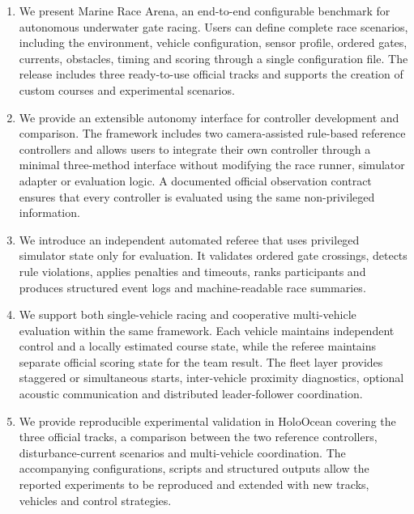 \begin{enumerate}

\item We present Marine Race Arena, an end-to-end configurable benchmark for autonomous underwater gate racing. Users can define complete race scenarios, including the environment, vehicle configuration, sensor profile, ordered gates, currents, obstacles, timing and scoring through a single configuration file. The release includes three ready-to-use official tracks and supports the creation of custom courses and experimental scenarios.

\item We provide an extensible autonomy interface for controller development and comparison. The framework includes two camera-assisted rule-based reference controllers and allows users to integrate their own controller through a minimal three-method interface without modifying the race runner, simulator adapter or evaluation logic. A documented official observation contract ensures that every controller is evaluated using the same non-privileged information.

\item We introduce an independent automated referee that uses privileged simulator state only for evaluation. It validates ordered gate crossings, detects rule violations, applies penalties and timeouts, ranks participants and produces structured event logs and machine-readable race summaries.

\item We support both single-vehicle racing and cooperative multi-vehicle evaluation within the same framework. Each vehicle maintains independent control and a locally estimated course state, while the referee maintains separate official scoring state for the team result. The fleet layer provides staggered or simultaneous starts, inter-vehicle proximity diagnostics, optional acoustic communication and distributed leader-follower coordination.

\item We provide reproducible experimental validation in HoloOcean covering the three official tracks, a comparison between the two reference controllers, disturbance-current scenarios and multi-vehicle coordination. The accompanying configurations, scripts and structured outputs allow the reported experiments to be reproduced and extended with new tracks, vehicles and control strategies.

\end{enumerate}

